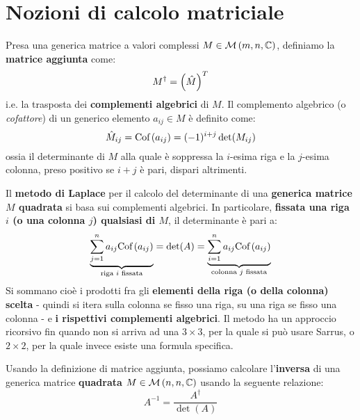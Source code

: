 \section{Nozioni di calcolo matriciale}
\begin{prop}
Presa una generica matrice a valori complessi $M \in \mathcal{M}\left( m,n,\mathbb{C} \right)$, definiamo la \textbf{matrice aggiunta} come:
\begin{equation}
M^\dag = \left( \hat M \right)^T\end{equation}
i.e. la trasposta dei \textbf{complementi algebrici} di $M$. Il complemento algebrico (o \textit{cofattore}) di un generico elemento $a_{ij} \in M$ è definito come:
\begin{equation}
\hat{M}_{ij} = \textrm{Cof}\left( a_{ij} \right) = (-1)^{i+j} \det(M_{ij})
\end{equation}
ossia il determinante di $M$ alla quale è soppressa la $i$-esima riga e la $j$-esima colonna, preso positivo se $i+j$ è pari, dispari altrimenti. 

\end{prop}
\begin{prop}
Il \textbf{metodo di Laplace} per il calcolo del determinante di una \textbf{generica matrice $M$ quadrata} si basa sui complementi algebrici. In particolare, \textbf{fissata una riga $i$ (o una colonna $j$) qualsiasi di $M$}, il determinante è pari a:
\begin{equation} \underbrace{\sum_{j=1}^n a_{ij} \textrm{Cof}\left( a_{ij} \right)}_{\textrm{riga $i$ fissata}} = \det(A) = \underbrace{\sum_{i=1}^n a_{ij} \textrm{Cof}\left( a_{ij} \right)}_{\textrm{colonna $j$ fissata}}
\end{equation}
Si sommano cioè i prodotti fra gli \textbf{elementi della riga (o della colonna) scelta} - quindi si itera sulla colonna se fisso una riga, su una riga se fisso una colonna - e \textbf{i rispettivi complementi algebrici}. Il metodo ha un approccio ricorsivo fin quando non si arriva ad una $3\times 3$, per la quale si può usare Sarrus, o $2\times 2$, per la quale invece esiste una formula specifica.
\end{prop}
\begin{prop}
Usando la definizione di matrice aggiunta, possiamo calcolare l'\textbf{inversa} di una generica matrice \textbf{quadrata} $M \in \mathcal{M}\left( n,n,\mathbb{C} \right)$ usando la seguente relazione:
\begin{equation}
A^{-1} = \frac{A^\dag}{\det(A)}
\end{equation}
\end{prop}

